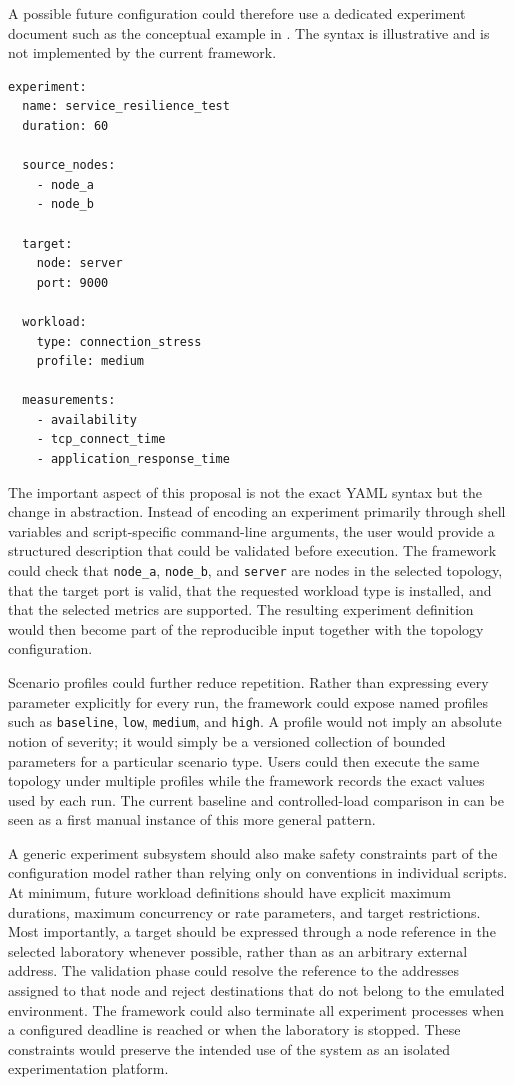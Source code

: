 A possible future configuration could therefore use a dedicated experiment
document such as the conceptual example in
. The syntax is illustrative and is not
implemented by the current framework.

\begin{lstlisting}[caption={Conceptual declarative definition of a controlled experiment.},label={lst:future-experiment-definition}]
experiment:
  name: service_resilience_test
  duration: 60

  source_nodes:
    - node_a
    - node_b

  target:
    node: server
    port: 9000

  workload:
    type: connection_stress
    profile: medium

  measurements:
    - availability
    - tcp_connect_time
    - application_response_time
\end{lstlisting}

The important aspect of this proposal is not the exact YAML syntax but the
change in abstraction. Instead of encoding an experiment primarily through
shell variables and script-specific command-line arguments, the user would
provide a structured description that could be validated before execution.
The framework could check that \texttt{node\_a}, \texttt{node\_b}, and
\texttt{server} are nodes in the selected topology, that the target port is
valid, that the requested workload type is installed, and that the selected
metrics are supported. The resulting experiment definition would then become
part of the reproducible input together with the topology configuration.

Scenario profiles could further reduce repetition. Rather than expressing every
parameter explicitly for every run, the framework could expose named profiles
such as \texttt{baseline}, \texttt{low}, \texttt{medium}, and \texttt{high}.
A profile would not imply an absolute notion of severity; it would simply be a
versioned collection of bounded parameters for a particular scenario type.
Users could then execute the same topology under multiple profiles while the
framework records the exact values used by each run. The current baseline and
controlled-load comparison in  can be seen
as a first manual instance of this more general pattern.

A generic experiment subsystem should also make safety constraints part of the
configuration model rather than relying only on conventions in individual
scripts. At minimum, future workload definitions should have explicit maximum
durations, maximum concurrency or rate parameters, and target restrictions.
Most importantly, a target should be expressed through a node reference in the
selected laboratory whenever possible, rather than as an arbitrary external
address. The validation phase could resolve the reference to the addresses
assigned to that node and reject destinations that do not belong to the
emulated environment. The framework could also terminate all experiment
processes when a configured deadline is reached or when the laboratory is
stopped. These constraints would preserve the intended use of the system as an
isolated experimentation platform.

